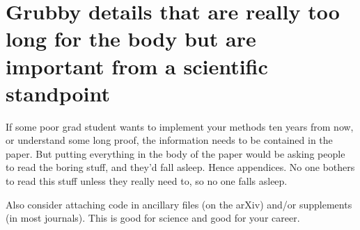 \documentclass[reprint, aps, prd, letterpaper, noshowpacs, amsmath, %
amssymb, amsfonts, nofootinbib, floatfix, superscriptaddress, %
twoside]{revtex4-1}
\begin{document}
\appendix* %


\section{Grubby details that are really too long for the body but are
  important from a scientific standpoint}
\label{sec:GrubbyDetails}

If some poor grad student wants to implement your methods ten years
from now, or understand some long proof, the information needs to be
contained in the paper.  But putting everything in the body of the
paper would be asking people to read the boring stuff, and they'd fall
asleep.  Hence appendices.  No one bothers to read this stuff unless
they really need to, so no one falls asleep.

Also consider attaching code in ancillary files (on the arXiv) and/or
supplements (in most journals).  This is good for science and good for
your career.



\vfil


\let\c\Originalcdefinition
\let\d\Originalddefinition
\let\i\Originalidefinition



\end{document}
